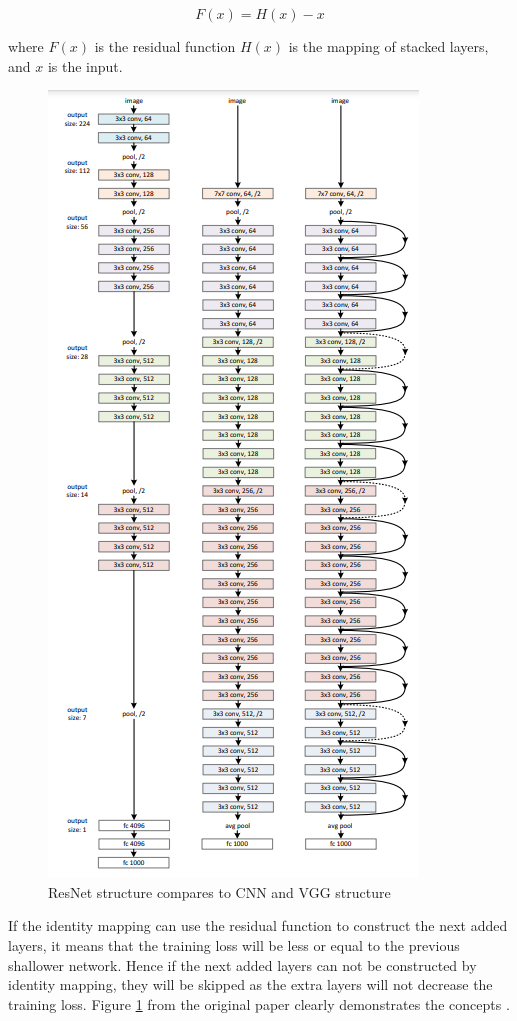 \documentclass{article} %
\begin{document}
\begin{equation}
F\left ( x \right ) = H\left ( x \right ) - x
\end{equation}

where $F\left ( x \right)$ is the residual function $ H\left ( x \right )$ is the mapping of stacked layers, and $x$ is the input.

\begin{figure}
\includegraphics[width=0.5\linewidth]{ResNet}
\caption{ResNet structure compares to CNN and VGG structure \label{fig:resnet}}
\end{figure}

If the identity mapping can use the residual function to construct the next added layers, it means that the training loss will be less or equal to the previous shallower network. Hence if the next added layers can not be constructed by identity mapping, they will be skipped as the extra layers will not decrease the training loss. Figure \ref{fig:resnet} from the original paper clearly demonstrates the concepts \cite{Dummy:5}.
\end{document}

